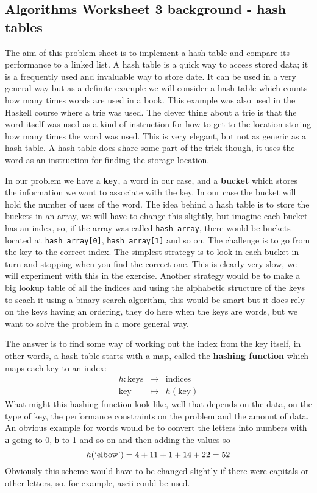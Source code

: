 \documentclass[11pt,a4paper]{scrartcl}
\begin{document}
\subsection*{Algorithms Worksheet 3 background - hash tables}
The aim of this problem sheet is to implement a hash table and compare
its performance to a linked list. A hash table is a quick way to
access stored data; it is a frequently used and invaluable way to
store date. It can be used in a very general way but as a definite
example we will consider a hash table which counts how many times
words are used in a book. This example was also used in the Haskell
course where a trie was used. The clever thing about a trie is that
the word itself was used as a kind of instruction for how to get to
the location storing how many times the word was used. This is very
elegant, but not as generic as a hash table. A hash table does share
some part of the trick though, it uses the word as an instruction for
finding the storage location.

In our problem we have a \textbf{key}, a word in our case, and a
\textbf{bucket} which stores the information we want to associate with
the key. In our case the bucket will hold the number of uses of the
word. The idea behind a hash table is to store the buckets in an
array, we will have to change this slightly, but imagine each bucket
has an index, so, if the array was called \texttt{hash\_array}, there
would be buckets located at \texttt{hash\_array[0]},
\texttt{hash\_array[1]} and so on. The challenge is to go from the key
to the correct index. The simplest strategy is to look in each bucket
in turn and stopping when you find the correct one. This is clearly
very slow, we will experiment with this in the exercise. Another
strategy would be to make a big lookup table of all the indices and
using the alphabetic structure of the keys to seach it using a binary
search algorithm, this would be smart but it does rely on the keys
having an ordering, they do here when the keys are words, but we want
to solve the problem in a more general way.

The answer is to find some way of working out the index from the key
itself, in other words, a hash table starts with a map, called the
\textbf{hashing function} which maps each key to an index:
\begin{eqnarray}
h:\mbox{keys}&\rightarrow&\mbox{indices}\\
\mbox{key}&\mapsto&h(\mbox{key})
\end{eqnarray}
What might this hashing function look like, well that depends on the
data, on the type of key, the performance constraints on the problem
and the amount of data. An obvious example for words would be to
convert the letters into numbers with \texttt{a} going to 0,
\texttt{b} to 1 and so on and then adding the values so
\begin{equation}
h(\mbox{\lq{}elbow\rq{}})=4+11+1+14+22=52
\end{equation}
Obviously this scheme would have to be changed slightly if there were
capitals or other letters, so, for example, ascii could be used. 
\end{document}
